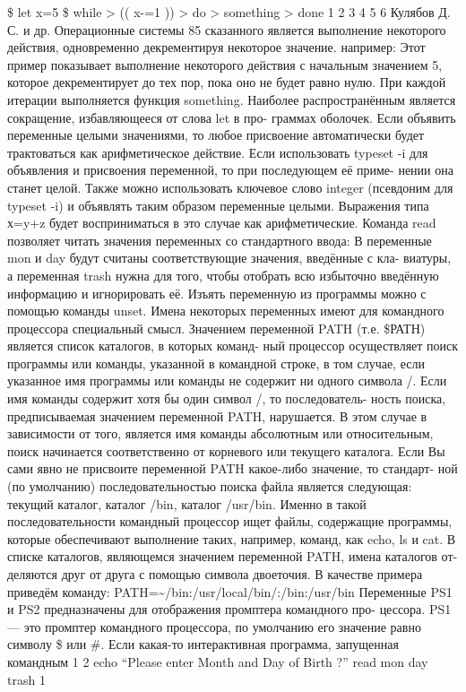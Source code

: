 \documentclass[
  letterpaper,
  DIV=11,
  numbers=noendperiod]{scrartcl}
\begin{document}
\$ let x=5 \$ while \textgreater{} (( x-=1 )) \textgreater{} do
\textgreater{} something \textgreater{} done 1 2 3 4 5 6 Кулябов Д. С. и
др. Операционные системы 85 сказанного является выполнение некоторого
действия, одновременно декрементируя некоторое значение. например: Этот
пример показывает выполнение некоторого действия с начальным значением
5, которое декрементирует до тех пор, пока оно не будет равно нулю. При
каждой итерации выполняется функция something. Наиболее распространённым
является сокращение, избавляющееся от слова let в про- граммах оболочек.
Если объявить переменные целыми значениями, то любое присвоение
автоматически будет трактоваться как арифметическое действие. Если
использовать typeset -i для объявления и присвоения переменной, то при
последующем её приме- нении она станет целой. Также можно использовать
ключевое слово integer (псевдоним для typeset -i) и объявлять таким
образом переменные целыми. Выражения типа х=y+z будет восприниматься в
это случае как арифметические. Команда read позволяет читать значения
переменных со стандартного ввода: В переменные mon и day будут считаны
соответствующие значения, введённые с кла- виатуры, а переменная trash
нужна для того, чтобы отобрать всю избыточно введённую информацию и
игнорировать её. Изъять переменную из программы можно с помощью команды
unset. Имена некоторых переменных имеют для командного процессора
специальный смысл. Значением переменной PATH (т.е. \$РАТН) является
список каталогов, в которых команд- ный процессор осуществляет поиск
программы или команды, указанной в командной строке, в том случае, если
указанное имя программы или команды не содержит ни одного символа /.
Если имя команды содержит хотя бы один символ /, то последователь- ность
поиска, предписываемая значением переменной PATH, нарушается. В этом
случае в зависимости от того, является имя команды абсолютным или
относительным, поиск начинается соответственно от корневого или текущего
каталога. Если Вы сами явно не присвоите переменной PATH какое-либо
значение, то стандарт- ной (по умолчанию) последовательностью поиска
файла является следующая: текущий каталог, каталог /bin, каталог
/usr/bin. Именно в такой последовательности командный процессор ищет
файлы, содержащие программы, которые обеспечивают выполнение таких,
например, команд, как echo, ls и cat. В списке каталогов, являющемся
значением переменной PATH, имена каталогов от- деляются друг от друга с
помощью символа двоеточия. В качестве примера приведём команду:
PATH=\textasciitilde/bin:/usr/local/bin/:/bin:/usr/bin Переменные PS1 и
PS2 предназначены для отображения промптера командного про- цессора. PS1
--- это промптер командного процессора, по умолчанию его значение равно
символу \$ или \#. Если какая-то интерактивная программа, запущенная
командным 1 2 echo ``Please enter Month and Day of Birth ?'' read mon
day trash 1
\end{document}

